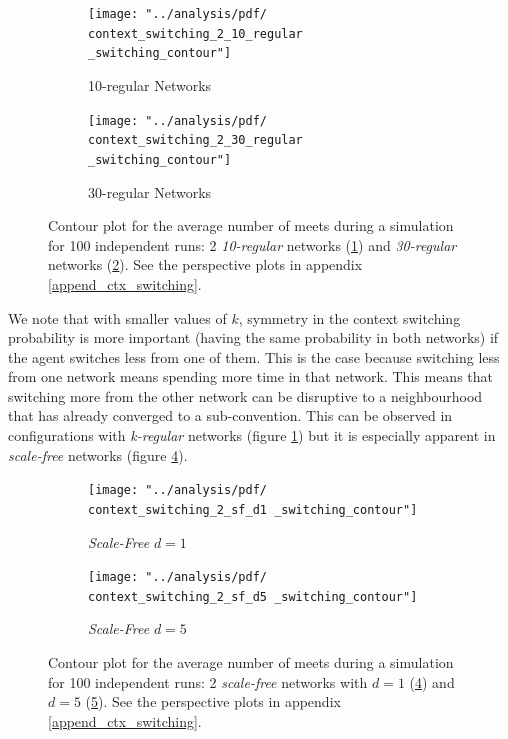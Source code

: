\documentclass[preprint,number]{elsarticle}
\begin{document}
\begin{figure}[H]
	\centering
	\begin{subfigure}{0.49\linewidth}
		\centering
		\texttt{[image: "../analysis/pdf/  context\_switching\_2\_10\_regular \_switching\_contour"]}
		\caption{10-regular Networks}
		\label{fig:ctx_cs_2_10kreg}
	\end{subfigure}%
	\begin{subfigure}{0.49\linewidth}
		\centering
		\texttt{[image: "../analysis/pdf/  context\_switching\_2\_30\_regular \_switching\_contour"]}
		\caption{30-regular Networks}
		\label{fig:ctx_cs_2_30kreg}
	\end{subfigure}
	
	\begin{minipage}{0.9\linewidth}
		\vspace{0.2cm}
		\caption{Contour plot for the average number of meets during a simulation for 100 independent runs: 2 \textit{10-regular} networks (\ref{fig:ctx_cs_2_10kreg}) and \textit{30-regular} networks (\ref{fig:ctx_cs_2_30kreg}). See the perspective plots in appendix \ref{append_ctx_switching}.}
		\label{fig:ctx_cs_2_kregular}
	\end{minipage}
\end{figure}

\noindent We note that with smaller values of $k$, symmetry in the context switching probability is more important (having the same probability in both networks) if the agent switches less from one of them. This is the case because switching less from one network means spending more time in that network. This means that switching more from the other network can be disruptive to a neighbourhood that has already converged to a sub-convention. This can be observed in configurations with \textit{k-regular} networks (figure \ref{fig:ctx_cs_2_10kreg}) but it is especially apparent in \textit{scale-free} networks (figure \ref{fig:ctx_cs_2_sf_d1}).

\begin{figure}[H]
	\centering
	\begin{subfigure}{0.49\linewidth}
		\centering
		\texttt{[image: "../analysis/pdf/  context\_switching\_2\_sf\_d1 \_switching\_contour"]}
		\caption{\textit{Scale-Free} $d=1$}
		\label{fig:ctx_cs_2_sf_d1}
	\end{subfigure}%
	\begin{subfigure}{0.49\linewidth}
		\centering
		\texttt{[image: "../analysis/pdf/  context\_switching\_2\_sf\_d5 \_switching\_contour"]}
		\caption{\textit{Scale-Free} $d=5$}
		\label{fig:ctx_cs_2_sf_d5}
	\end{subfigure}
	
	\begin{minipage}{0.9\linewidth}
		\vspace{0.2cm}
		\caption{Contour plot for the average number of meets during a simulation for 100 independent runs: 2 \textit{scale-free} networks with $d=1$ (\ref{fig:ctx_cs_2_sf_d1}) and $d=5$ (\ref{fig:ctx_cs_2_sf_d5}). See the perspective plots in  appendix \ref{append_ctx_switching}.}
		\label{fig:ctx_cs_2_sf}
	\end{minipage}
\end{figure}
\end{document}
